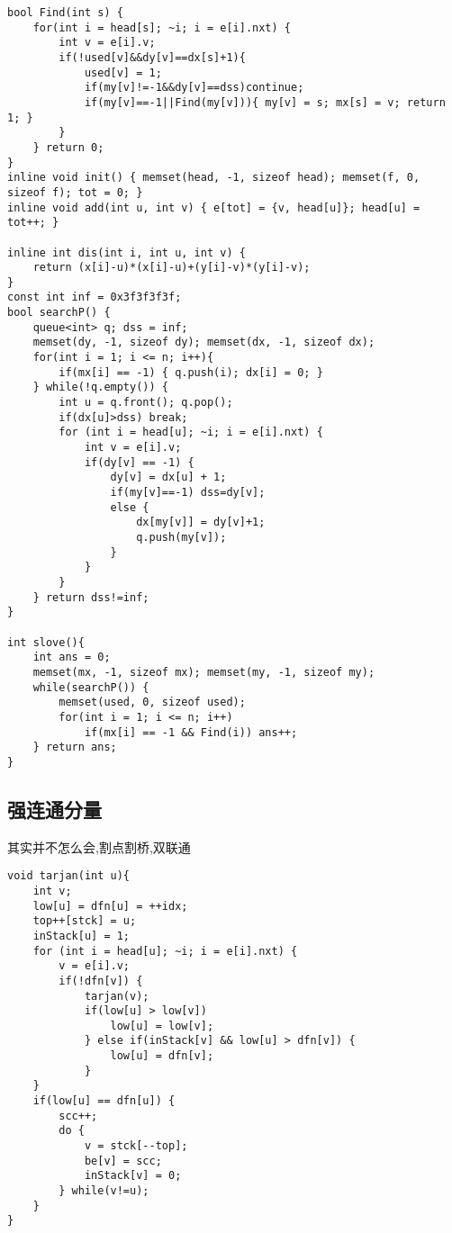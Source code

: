 \begin{lstlisting}
bool Find(int s) {
    for(int i = head[s]; ~i; i = e[i].nxt) {
        int v = e[i].v;
        if(!used[v]&&dy[v]==dx[s]+1){
            used[v] = 1;
            if(my[v]!=-1&&dy[v]==dss)continue;
            if(my[v]==-1||Find(my[v])){ my[v] = s; mx[s] = v; return 1; }
        }
    } return 0;
}
inline void init() { memset(head, -1, sizeof head); memset(f, 0, sizeof f); tot = 0; }
inline void add(int u, int v) { e[tot] = {v, head[u]}; head[u] = tot++; }

inline int dis(int i, int u, int v) {
    return (x[i]-u)*(x[i]-u)+(y[i]-v)*(y[i]-v);
}
const int inf = 0x3f3f3f3f;
bool searchP() {
    queue<int> q; dss = inf;
    memset(dy, -1, sizeof dy); memset(dx, -1, sizeof dx);
    for(int i = 1; i <= n; i++){
        if(mx[i] == -1) { q.push(i); dx[i] = 0; }
    } while(!q.empty()) {
        int u = q.front(); q.pop();
        if(dx[u]>dss) break;
        for (int i = head[u]; ~i; i = e[i].nxt) {
            int v = e[i].v;
            if(dy[v] == -1) {
                dy[v] = dx[u] + 1;
                if(my[v]==-1) dss=dy[v];
                else {
                    dx[my[v]] = dy[v]+1;
                    q.push(my[v]);
                }
            }
        }
    } return dss!=inf;
}

int slove(){
    int ans = 0;
    memset(mx, -1, sizeof mx); memset(my, -1, sizeof my);
    while(searchP()) {
        memset(used, 0, sizeof used);
        for(int i = 1; i <= n; i++)
            if(mx[i] == -1 && Find(i)) ans++;
    } return ans;
}
\end{lstlisting}


\subsection{强连通分量}
其实并不怎么会,割点割桥,双联通
\begin{lstlisting}
void tarjan(int u){
    int v;
    low[u] = dfn[u] = ++idx;
    top++[stck] = u;
    inStack[u] = 1;
    for (int i = head[u]; ~i; i = e[i].nxt) {
        v = e[i].v;
        if(!dfn[v]) {
            tarjan(v);
            if(low[u] > low[v])
                low[u] = low[v];
            } else if(inStack[v] && low[u] > dfn[v]) {
                low[u] = dfn[v];
            }
    }
    if(low[u] == dfn[u]) {
        scc++;
        do {
            v = stck[--top];
            be[v] = scc;
            inStack[v] = 0;
        } while(v!=u);
    }
}
\end{lstlisting}



